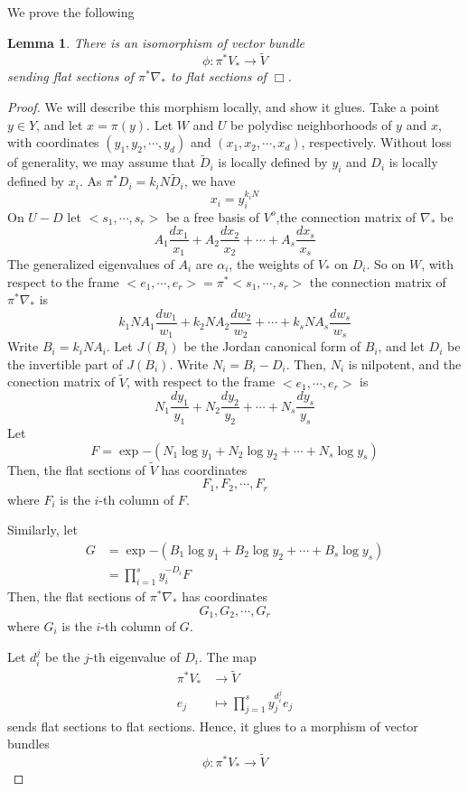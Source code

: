 \documentclass{amsart}
\newtheorem{lemma}[thm]{Lemma}
\newcommand{\pullback}[1]{{#1}^*}
\begin{document}
We prove the following
\begin{lemma}\label{lemma2.4} 
There is an isomorphism of vector bundle
\[
    \phi : \pullback{\pi}V_* \rightarrow \tilde V
\]
sending flat sections of $\pullback{\pi}\nabla_*$ to flat sections of $\Box$.
\end{lemma}
\begin{proof}
We will describe this morphism locally, and show it glues.
Take a point $y \in Y$, and let $x = \pi(y)$. Let $W$ and $U$ be polydisc neighborhoods
of $y$ and $x$, with coordinates $(y_1,y_2,\cdots,y_d)$ and $(x_1,x_2,\cdots,x_d)$, respectively.
Without loss of generality, we may assume that $\tilde D_i$ is locally defined by $y_i$ and $D_i$
is locally defined by $x_i$. As $\pullback{\pi}D_i = k_iN\tilde D_i$, we have
\[
    x_i = y_i^{k_iN}
\]
On $U-D$ let $<s_1,\cdots,s_r>$ be a free basis of $V^o$,the connection matrix of $\nabla_*$ be 
\[
    A_1\frac{dx_1}{x_1} + A_2\frac{dx_2}{x_2} + \cdots + A_s\frac{dx_s}{x_s}
\]
The generalized eigenvalues of $A_i$ are $\alpha_{i}$, the weights of $V_*$ on $D_i$. 
So on $W$, with respect to the frame $<e_1,\cdots,e_r> = \pullback{\pi}<s_1,\cdots,s_r>$ 
the connection matrix of $\pullback{\pi}\nabla_*$ is 
\[
    k_1NA_1\frac{dw_1}{w_1} + k_2NA_2\frac{dw_2}{w_2} + \cdots + k_sNA_s\frac{dw_s}{w_s}
\]
Write $B_i = k_iNA_i$. Let $J(B_i)$ be the Jordan canonical form of $B_i$, and let $D_i$ be 
the invertible part of $J(B_i)$. Write $N_i = B_i - D_i$. Then, $N_i$ is nilpotent, and the
conection matrix of $\tilde V$, with respect to the frame $<e_1,\cdots,e_r>$ is
\[
    N_1\frac{dy_1}{y_1} + N_2\frac{dy_2}{y_2} + \cdots + N_s\frac{dy_s}{y_s}
\]
Let 
\[
    F = \exp{-(N_1\log y_1 + N_2\log y_2 + \cdots + N_s\log y_s)}
\]
Then, the flat sections of $\tilde V$ has coordinates
\[
    F_1, F_2,\cdots, F_r
\]
where $F_i$ is the $i$-th column of $F$.

Similarly, let 
\begin{align*}
    G & = \exp{-(B_1\log y_1 + B_2\log y_2 + \cdots + B_s\log y_s)} \\
      & = \prod\limits_{i=1}^{s}y_i^{-D_i}F
\end{align*}
Then, the flat sections of $\pullback{\pi}\nabla_*$ has coordinates
\[
    G_1, G_2,\cdots, G_r
\]
where $G_i$ is the $i$-th column of $G$.

Let $d_i^j$ be the $j$-th eigenvalue of $D_i$. The map
\begin{align*}
    \pullback{\pi}V_* & \rightarrow \tilde V \\
                  e_j & \mapsto \prod\limits_{j=1}^{s}y_j^{d_i^j}e_j
\end{align*}
sends flat sections to flat sections. Hence, it glues to a morphism of vector bundles
\[
    \phi: \pullback{\pi}V_* \rightarrow \tilde V
\]
\end{proof}
\end{document}
